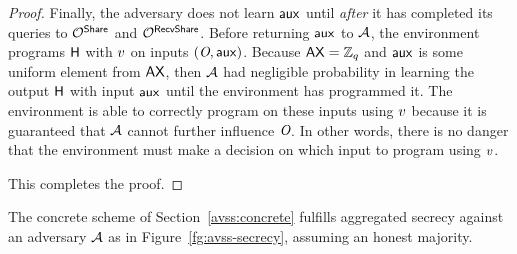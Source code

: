 \begin{proof}
  Finally, the adversary does not learn $\mathsf{aux}$ until \emph{after} it has completed its queries to $\mathcal{O}^{\mathsf{Share}}$ and $\mathcal{O}^{\mathsf{RecvShare}}$.
  Before returning $\mathsf{aux}$ to $\mathcal{A}$,
  the environment programs $\mathsf{H}$ with $v$ on inputs $(\textit{O}, \mathsf{aux})$.
  Because $\mathsf{AX} = \mathbb{Z}_q$ and $\mathsf{aux}$ is some uniform element from $\mathsf{AX}$,
  then $\mathcal{A}$ had negligible probability in learning the output $\mathsf{H}$ with input
  $\mathsf{aux}$ until the environment has programmed it.
  The environment is able to correctly program on these inputs using $v$ because it is guaranteed that $\mathcal{A}$ cannot further influence $\textit{O}$.
  In other words, there is no danger that the environment must make a decision on which input to program using $v$.

  This completes the proof.
\end{proof}

\begin{theorem} \label{thm:avss-secrecy}
  The concrete scheme of Section~\ref{avss:concrete} fulfills aggregated secrecy against an adversary $\mathcal{A}$ as in Figure~\ref{fg:avss-secrecy}, assuming an honest majority.
\end{theorem}


